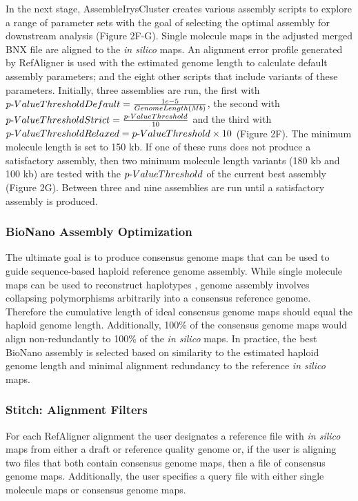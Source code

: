 \documentclass{bmcart}
\begin{document}
In the next stage, AssembleIrysCluster creates various assembly scripts to explore a range of parameter sets with the goal of selecting the optimal assembly for downstream analysis (Figure 2F-G). Single molecule maps in the adjusted merged BNX file are aligned to the \textit{in silico} maps. An alignment error profile generated by RefAligner is used with the estimated genome length to calculate default assembly parameters; and the eight other scripts that include variants of these parameters. Initially, three assemblies are run, the first with $p\textnormal{-}Value Threshold Default = \frac{1e-5}{Genome Length (Mb)}$, the second with  $p\textnormal{-}Value Threshold Strict = \frac{p\textnormal{-}Value Threshold}{10}$ and the third with $p\textnormal{-}Value Threshold Relaxed = {p\textnormal{-}Value Threshold} \times {10}$ (Figure 2F). The minimum molecule length is set to 150 kb. If one of these runs does not produce a satisfactory assembly, then two minimum molecule length variants (180 kb and 100 kb) are tested with the $p\textnormal{-}Value Threshold$ of the current best assembly (Figure 2G). Between three and nine assemblies are run until a satisfactory assembly is produced.

\subsubsection*{BioNano Assembly Optimization}

The ultimate goal is to produce consensus genome maps that can be used to guide sequence-based haploid reference genome assembly. While single molecule maps can be used to reconstruct haplotypes \cite{MHCLam}, genome assembly involves collapsing polymorphisms arbitrarily into a consensus reference genome. Therefore the cumulative length of ideal consensus genome maps should equal the haploid genome length. Additionally, 100\% of the consensus genome maps would align non-redundantly to 100\% of the \textit{in silico} maps. In practice, the best BioNano assembly is selected based on similarity to the estimated haploid genome length and minimal alignment redundancy to the reference \textit{in silico} maps.

\subsubsection*{Stitch: Alignment Filters}

For each RefAligner alignment the user designates a reference file with \textit{in silico} maps from either a draft or reference quality genome or, if the user is aligning two files that both contain consensus genome maps, then a file of consensus genome maps. Additionally, the user specifies a query file with either single molecule maps or consensus genome maps. 
\end{document}
